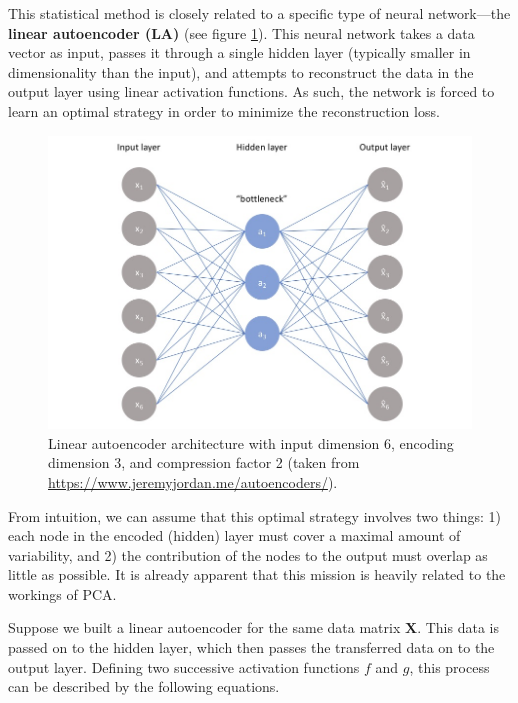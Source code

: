 This statistical method is closely related to a specific type of neural network---the \textbf{linear autoencoder (LA)} (see figure \ref{fig:linear_autoencoder}). This neural network takes a data vector as input, passes it through a single hidden layer (typically smaller in dimensionality than the input), and attempts to reconstruct the data in the output layer using linear activation functions. As such, the network is forced to learn an optimal strategy in order to minimize the reconstruction loss.

\begin{figure}[htbp]
	\begin{center}
		\includegraphics[width=\linewidth]{images/autoencoder.jpg}
		\caption{Linear autoencoder architecture with input dimension 6, encoding dimension 3, and compression factor 2 (taken from \textcolor{blue}{\url{https://www.jeremyjordan.me/autoencoders/}}).}
		\label{fig:linear_autoencoder}
	\end{center}
\end{figure}

From intuition, we can assume that this optimal strategy involves two things: 1) each node in the encoded (hidden) layer must cover a maximal amount of variability, and 2) the contribution of the nodes to the output must overlap as little as possible. It is already apparent that this mission is heavily related to the workings of PCA. 

Suppose we built a linear autoencoder for the same data matrix $\mathbf{X}$. This data is passed on to the hidden layer, which then passes the transferred data on to the output layer. Defining two successive activation functions $f$ and $g$, this process can be described by the following equations.

